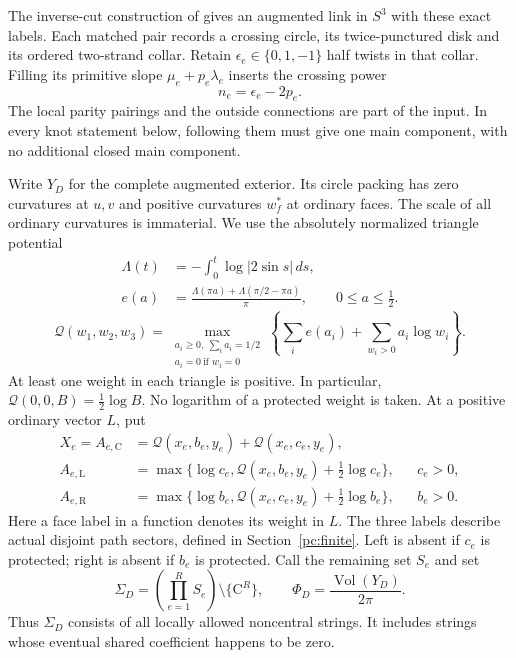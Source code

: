 \documentclass[11pt]{article}
\numberwithin{equation}{section}
\theoremstyle{definition}\newtheorem{definition}[theorem]{Definition}
\theoremstyle{remark}\newtheorem{remark}[theorem]{Remark}
\newcommand{\Vol}{\operatorname{Vol}}
\newcommand{\C}{\mathrm C}
\newcommand{\Lft}{\mathrm L}
\newcommand{\Rgt}{\mathrm R}
\newcommand{\calQ}{\mathcal Q}
\begin{document}
The inverse-cut construction of \cite[Section 2]{Geometry} gives an
augmented link in \(S^3\) with these exact labels. Each matched pair
records a crossing circle, its twice-punctured disk and its ordered
two-strand collar. Retain \(\epsilon_e\in\{0,1,-1\}\) half twists in
that collar. Filling its primitive slope \(\mu_e+p_e\lambda_e\)
inserts the crossing power
\begin{equation}\label{pc:powers}
                         n_e=\epsilon_e-2p_e .
\end{equation}
The local parity pairings and the outside connections are part of
the input. In every knot statement below, following them must give
one main component, with no additional closed main component.

Write \(Y_D\) for the complete augmented exterior. Its circle packing
has zero curvatures at \(u,v\) and positive curvatures \(w_f^*\) at
ordinary faces. The scale of all ordinary curvatures is immaterial.
We use the absolutely normalized triangle potential
\begin{equation}\label{pc:entropy}
\begin{aligned}
 \Lambda(t)&=-\int_0^t\log|2\sin s|\,ds,\\
 e(a)&=\frac{\Lambda(\pi a)+\Lambda(\pi/2-\pi a)}{\pi},
                  \qquad 0\le a\le\tfrac12.
\end{aligned}
\end{equation}
\begin{equation}\label{pc:Q}
 \calQ(w_1,w_2,w_3)
 =\max_{\substack{a_i\ge0,\ \sum_i a_i=1/2\\a_i=0\ \text{if }w_i=0}}
       \left\{\sum_i e(a_i)+\sum_{w_i>0}a_i\log w_i\right\}.
\end{equation}
At least one weight in each triangle is positive. In particular,
\(\calQ(0,0,B)=\frac12\log B\). No logarithm of a protected weight
is taken. At a positive ordinary vector \(L\), put
\begin{equation}\label{pc:rates}
\begin{aligned}
 X_e=A_{e,\C}&=\calQ(x_e,b_e,y_e)+\calQ(x_e,c_e,y_e),\\
 A_{e,\Lft}&=\max\{\log c_e,\calQ(x_e,b_e,y_e)+\tfrac12\log c_e\},
                                                   &&c_e>0,\\
 A_{e,\Rgt}&=\max\{\log b_e,\calQ(x_e,c_e,y_e)+\tfrac12\log b_e\},
                                                   &&b_e>0.
\end{aligned}
\end{equation}
Here a face label in a function denotes its weight in \(L\).
The three labels describe actual disjoint path sectors, defined in
Section~\ref{pc:finite}. Left is absent if \(c_e\) is protected;
right is absent if \(b_e\) is protected. Call the remaining set \(S_e\)
and set
\[
 \Sigma_D=\left(\prod_{e=1}^R S_e\right)\setminus\{\C^R\},\qquad
 \Phi_D=\frac{\Vol(Y_D)}{2\pi}.
\]
Thus \(\Sigma_D\) consists of all locally allowed noncentral strings.
It includes strings whose eventual shared coefficient happens to be zero.
\end{document}
